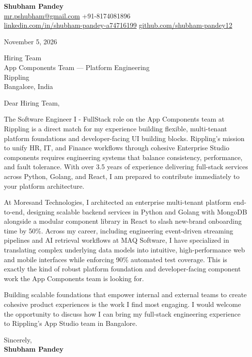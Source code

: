 \documentclass[a4paper,11pt]{article}
\begin{document}
\textbf{\Large Shubham Pandey}\\
\href{mailto:mr.pshubham@gmail.com}{mr.pshubham@gmail.com} \quad +91-8174081896\\
\href{https://www.linkedin.com/in/shubham-pandey-a74716199/}{linkedin.com/in/shubham-pandey-a74716199} \quad
\href{https://github.com/shubham-pandey12}{github.com/shubham-pandey12}

\vspace{1em}
November 5, 2026

\vspace{1em}
Hiring Team\\
App Components Team --- Platform Engineering\\
Rippling\\
Bangalore, India

\vspace{1em}
Dear Hiring Team,

The Software Engineer I - FullStack role on the App Components team at Rippling is a direct match for my experience building flexible, multi-tenant platform foundations and developer-facing UI building blocks. Rippling’s mission to unify HR, IT, and Finance workflows through cohesive Enterprise Studio components requires engineering systems that balance consistency, performance, and fault tolerance. With over 3.5 years of experience delivering full-stack services across Python, Golang, and React, I am prepared to contribute immediately to your platform architecture.

At Moresand Technologies, I architected an enterprise multi-tenant platform end-to-end, designing scalable backend services in Python and Golang with MongoDB alongside a modular component library in React to slash new-brand onboarding time by 50\%. Across my career, including engineering event-driven streaming pipelines and AI retrieval workflows at MAQ Software, I have specialized in translating complex underlying data models into intuitive, high-performance web and mobile interfaces while enforcing 90\% automated test coverage. This is exactly the kind of robust platform foundation and developer-facing component work the App Components team is looking for.

Building scalable foundations that empower internal and external teams to create cohesive product experiences is the work I find most engaging. I would welcome the opportunity to discuss how I can bring my full-stack engineering experience to Rippling's App Studio team in Bangalore.

\vspace{1em}
Sincerely,\\[0.5em]
\textbf{Shubham Pandey}
\end{document}
